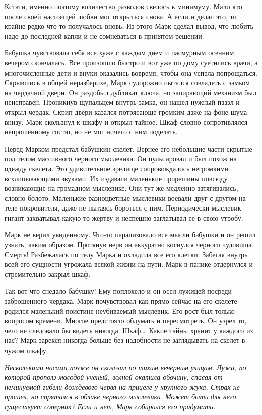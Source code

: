 Кстати, именно поэтому количество разводов свелось к минимуму. Мало кто после 
своей настоящей любви мог открыться снова. А если и делал это, то крайне редко 
что-то получалось вновь. Из этого Марк сделал вывод, что любить надо до 
последней капли и не сомневаться в принятом решении.

Бабушка чувствовала себя все хуже с каждым днем и пасмурным осенним вечером 
скончалась. Все произошло быстро и вот уже по дому суетились врачи, а 
многочисленные дети и внуки оказались вовремя, чтобы она успела попрощаться.
Скрывшись в общей неразберихе, Марк судорожно пытался совладеть с замком на 
чердачной двери. Он раздобыл дубликат ключа, но запирающий механизм был 
неисправен. Проникнув щупальцем внутрь замка, он нашел нужный паззл и открыл 
чердак. Скрип двери казался потрясающе громким даже на фоне шума внизу.
Марк скользнул к шкафу и открыл тайное. Шкаф словно сопротивлялся непрошенному 
гостю, но не мог ничего с ним поделать.

Перед Марком предстал бабушкин скелет. Вернее его небольшие части скрытые под 
телом массивного черного мыслевика. Он пульсировал и был похож на одежду 
скелета. Это удивительное зрелище сопровождалось негромкими всхлипывающими 
звуками. Их издавали маленькие прорешины повсюду возникающие на громадном 
мыслевике. Они тут же медленно затягивались, словно болото. Маленькие 
разноцветные мыслевики воевали друг с другом на теле покровителя, даже не 
пытаясь бороться с ним. Периодически мыслевик-гигант захватывал какую-то жертву 
и неспешно заглатывал ее в свою утробу.

Марк не верил увиденному. Что-то парализовало все мысли бабушки и он решил 
узнать, каким образом. Протянув нерв он аккуратно коснулся черного чудовища.
Смерть! Разбежалась по телу Марка и охладила все его клетки. Забегая внутрь 
всей 
его сущности угрожала всякой жизни на пути. Марк в панике отдернулся и 
стремительно закрыл шкаф.

Так вот что снедало бабушку! Ему поплохело и он осел лужицей посреди 
заброшенного чердака. Марк почувствовал как прямо сейчас на его скелете родился 
маленький поистине неубиваемый мыслевик. Его рост был только вопросом времени.
Многое предстояло обдумать и пересмотреть. Он узрел то, чего не следовало бы 
видеть никогда. Шкаф\ldots\ Какие тайны хранит у каждого из нас? Марк зарекся 
никогда больше без надобности не заглядывать на скелет в чужом шкафу.

\emph{Несколькими часами позже он скользил по тихим вечерним улицам. Лужа, 
по которой прополз молодой ученый, волной окатила обочину, спасая от неминуемой 
гибели дождевого червя на прицеле у крупного жука. Страх не прошел, но 
спрятался 
в облике черного мыслевика. Может быть для него существует соперник? Если и 
нет, Марк собирался его придумать.}

\newpage
\thispagestyle{empty}
~